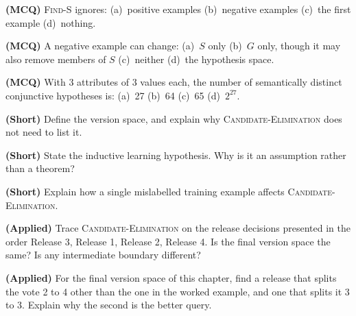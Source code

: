 \begin{reviewq}
  \item \textbf{(MCQ)} \textsc{Find-S} ignores: (a)~positive examples (b)~negative
        examples (c)~the first example (d)~nothing.
  \item \textbf{(MCQ)} A negative example can change: (a)~$S$ only (b)~$G$ only,
        though it may also remove members of $S$ (c)~neither (d)~the hypothesis
        space.
  \item \textbf{(MCQ)} With 3 attributes of 3 values each, the number of
        semantically distinct conjunctive hypotheses is: (a)~27 (b)~64 (c)~65
        (d)~$2^{27}$.
  \item \textbf{(Short)} Define the version space, and explain why
        \textsc{Candidate-Elimination} does not need to list it.
  \item \textbf{(Short)} State the inductive learning hypothesis. Why is it an
        assumption rather than a theorem?
  \item \textbf{(Short)} Explain how a single mislabelled training example affects
        \textsc{Candidate-Elimination}.
  \item \textbf{(Applied)} Trace \textsc{Candidate-Elimination} on the release
        decisions presented in the order Release 3, Release 1, Release 2,
        Release 4. Is the final version space the same? Is any intermediate
        boundary different?
  \item \textbf{(Applied)} For the final version space of this chapter, find a
        release that splits the vote 2 to 4 other than the one in the worked
        example, and one that splits it 3 to 3. Explain why the second is the
        better query.
\end{reviewq}
